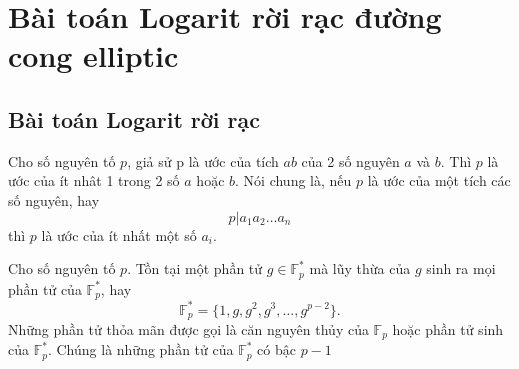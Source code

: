 \section{Bài toán Logarit rời rạc đường cong elliptic}
\subsection{Bài toán Logarit rời rạc}

\begin{proposition}
	\label{propos:pr1}
	Cho số nguyên tố $p$, giả sử p là ước của tích $ab$ của 2 số nguyên $a$ và $b$. Thì $p$ là ước của ít nhât 1 trong 2 số $a$ hoặc $b$.
	Nói chung là, nếu $p$ là ước của một tích các số nguyên, hay
	$$ p | a_1a_2\ldots a_n$$
	thì $p$ là ước của ít nhất một số $a_i$.
\end{proposition}

\begin{theorem}
	\label{th:primitiveroot}
	Cho số nguyên tố $p$. Tồn tại một phần tử $g \in \mathbb{F}^*_p$ mà lũy thừa của $g$ sinh ra mọi phần tử của $\mathbb{F}^*_p$, hay
	$$ \mathbb{F}^*_p = \{ 1, g, g^2, g^3, \ldots, g^{p-2} \}.$$
	Những phần tử thỏa mãn được gọi là căn nguyên thủy của $\mathbb{F}_p$ hoặc phần tử sinh của $\mathbb{F}_p^*$. Chúng là những phần tử của  $\mathbb{F}_p^*$ có bậc $p-1$
\end{theorem}

